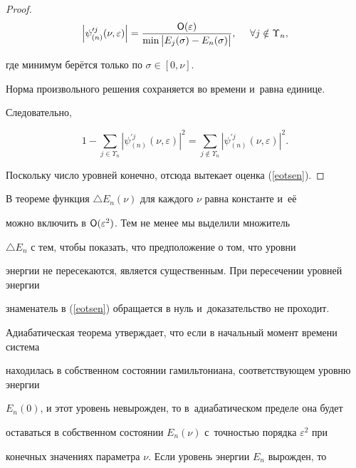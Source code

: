 \begin{proof}
\begin{equation*}

  \left|\psi^{\prime j}_{(n)}(\nu,\varepsilon )\right|=

  \frac{{\sf O}(\varepsilon )}{\min\big|E_j(\sigma )-E_n(\sigma )\big|},~~~~\forall j\notin\Upsilon_n,

\end{equation*}

где минимум берётся только по $\sigma \in[0,\nu]$.



Норма произвольного решения сохраняется во времени и~равна единице.

Следовательно,

\begin{equation*}

  1-\sum_{j\in\Upsilon_n}|\psi^{\prime j}_{(n)}(\nu,\varepsilon )|^2

  =\sum_{j\notin\Upsilon_n}|\psi^{\prime j}_{(n)}(\nu,\varepsilon )|^2.

\end{equation*}

Поскольку число уровней конечно, отсюда вытекает оценка (\ref{eotsen}).

\end{proof}



\smallskip

В теореме функция $\triangle E_n(\nu)$ для каждого $\nu$ равна константе и~её

можно включить в ${\sf O}(\varepsilon^2)$. Тем не менее мы выделили множитель

$\triangle E_n$ с тем, чтобы показать, что предположение о том, что уровни

энергии не пересекаются, является существенным. При пересечении уровней энергии

знаменатель в (\ref{eotsen}) обращается в нуль и~доказательство не проходит.



Адиабатическая теорема утверждает, что если в начальный момент времени система

находилась в собственном состоянии гамильтониана, соответствующем уровню энергии

$E_n(0)$, и этот уровень невырожден, то в~адиабатическом пределе она будет

оставаться в собственном состоянии $E_n(\nu)$ с~точностью порядка $\varepsilon^2$ при

конечных значениях параметра $\nu$. Если уровень энергии $E_n$ вырожден, то

